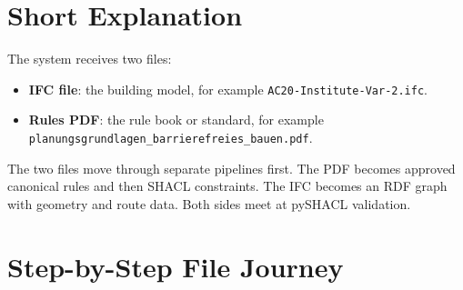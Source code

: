 \documentclass[11pt,a4paper]{article}
\begin{document}
\begin{center}
{
}
\end{center}

\section{Short Explanation}

The system receives two files:

\begin{itemize}
  \item \textbf{IFC file}: the building model, for example \texttt{AC20-Institute-Var-2.ifc}.
  \item \textbf{Rules PDF}: the rule book or standard, for example \texttt{planungsgrundlagen\_barrierefreies\_bauen.pdf}.
\end{itemize}

The two files move through separate pipelines first. The PDF becomes approved canonical rules and then SHACL constraints. The IFC becomes an RDF graph with geometry and route data. Both sides meet at pySHACL validation.

\section{Step-by-Step File Journey}
\end{document}
